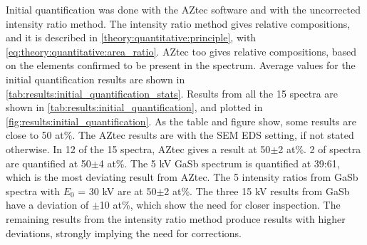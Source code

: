 Initial quantification was done with the AZtec software and with the uncorrected intensity ratio method.
The intensity ratio method gives relative compositions, and it is described in \cref{theory:quantitative:principle}, with \cref{eq:theory:quantitative:area_ratio}.
AZtec too gives relative compositions, based on the elements confirmed to be present in the spectrum.
Average values for the initial quantification results are shown in \cref{tab:results:initial_quantification_stats}.
Results from all the 15 spectra are shown in \cref{tab:results:initial_quantification}, and plotted in \cref{fig:results:initial_quantification}.
As the table and figure show, some results are close to 50 at\%.
The AZtec results are with the SEM EDS setting, if not stated otherwise.
In 12 of the 15 spectra, AZtec gives a result at 50$\pm$2 at\%.
2 of spectra are quantified at 50$\pm$4 at\%.
The 5 kV GaSb spectrum is quantified at 39:61, which is the most deviating result from AZtec.
The 5 intensity ratios from GaSb spectra with $E_0$ = 30 kV are at 50$\pm$2 at\%.
The three 15 kV results from GaSb have a deviation of $\pm$10 at\%, which show the need for closer inspection.
The remaining results from the intensity ratio method produce results with higher deviations, strongly implying the need for corrections.






